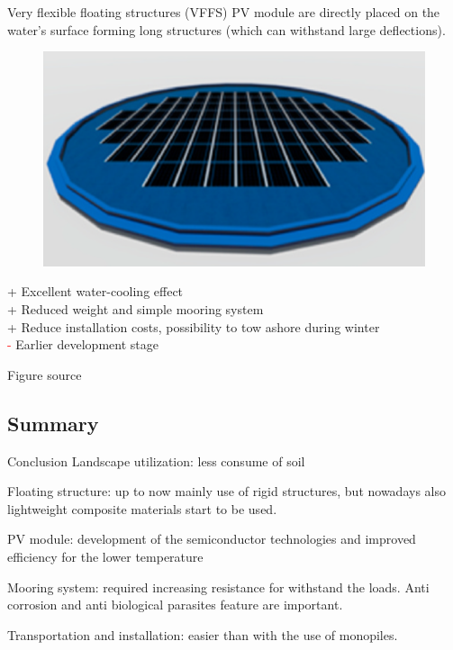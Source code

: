 \documentclass[aspectratio=169, 12pt]{beamer}
\begin{document}
\begin{frame}{Very flexible floating structures (VFFS)}
  PV module are directly placed on the water's surface forming long structures (which can withstand large deflections).

  \begin{figure}
    \centering
    \includegraphics[width=0.3\columnwidth]{figure/vffs.png}
  \end{figure}

  \textcolor{NTNUgreen}{+} Excellent water-cooling effect\\
  \textcolor{NTNUgreen}{+} Reduced weight and simple mooring system\\
  \textcolor{NTNUgreen}{+} Reduce installation costs, possibility to tow ashore during winter\\
  \textcolor{red}{-} Earlier development stage

  {\tiny Figure source \cite{vffs_figure}}
\end{frame}

\subsection{Summary}
\begin{frame}{Conclusion}
  \textcolor{NTNUBlue}{Landscape utilization}: less consume of soil
  
  \textcolor{NTNUBlue}{Floating structure}: up to now mainly use of rigid structures, but nowadays also lightweight composite materials start to be used.

  \textcolor{NTNUBlue}{PV module}: development of the semiconductor technologies and improved efficiency for the lower temperature

  \textcolor{NTNUBlue}{Mooring system}: required increasing resistance for withstand the loads. Anti corrosion and anti biological parasites feature are important. 

  \textcolor{NTNUBlue}{Transportation and installation}: easier than with the use of monopiles.

\end{frame}

                                  
\end{document}

